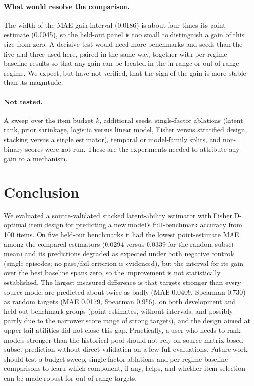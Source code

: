 \documentclass{article}
\begin{document}
\paragraph{What would resolve the comparison.} The width of the MAE-gain interval (0.0186) is about four times its point estimate (0.0045), so the held-out panel is too small to distinguish a gain of this size from zero. A decisive test would need more benchmarks and seeds than the five and three used here, paired in the same way, together with per-regime baseline results so that any gain can be located in the in-range or out-of-range regime. We expect, but have not verified, that the sign of the gain is more stable than its magnitude.

\paragraph{Not tested.} A sweep over the item budget $k$, additional seeds, single-factor ablations (latent rank, prior shrinkage, logistic versus linear model, Fisher versus stratified design, stacking versus a single estimator), temporal or model-family splits, and non-binary scores were not run. These are the experiments needed to attribute any gain to a mechanism.

\section{Conclusion}
We evaluated a source-validated stacked latent-ability estimator with Fisher D-optimal item design for predicting a new model's full-benchmark accuracy from 100 items. On five held-out benchmarks it had the lowest point-estimate MAE among the compared estimators (0.0294 versus 0.0339 for the random-subset mean) and its predictions degraded as expected under both negative controls (single episodes; no pass/fail criterion is evidenced), but the interval for its gain over the best baseline spans zero, so the improvement is not statistically established. The largest measured difference is that targets stronger than every source model are predicted about twice as badly (MAE 0.0409, Spearman 0.730) as random targets (MAE 0.0179, Spearman 0.956), on both development and held-out benchmark groups (point estimates, without intervals, and possibly partly due to the narrower score range of strong targets), and the design aimed at upper-tail abilities did not close this gap. Practically, a user who needs to rank models stronger than the historical pool should not rely on source-matrix-based subset prediction without direct validation on a few full evaluations. Future work should test a budget sweep, single-factor ablations and per-regime baseline comparisons to learn which component, if any, helps, and whether item selection can be made robust for out-of-range targets.
\end{document}
